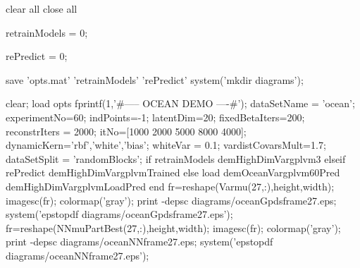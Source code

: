 \documentclass{article} %
\newenvironment{matlab}{\comment}{\endcomment}
\begin{document}
\begin{matlab}


clear all
close all

retrainModels = 0;

rePredict = 0;


save 'opts.mat' 'retrainModels' 'rePredict'
system('mkdir diagrams');

clear; load opts
fprintf(1,'\n\n#-----  OCEAN DEMO ----#\n');
dataSetName = 'ocean';
experimentNo=60;
indPoints=-1; latentDim=20;
fixedBetaIters=200; reconstrIters = 2000;
itNo=[1000 2000 5000 8000 4000];
dynamicKern={'rbf','white','bias'};
whiteVar = 0.1;  vardistCovarsMult=1.7;
dataSetSplit = 'randomBlocks';
if retrainModels
    demHighDimVargplvm3
elseif rePredict
    demHighDimVargplvmTrained
else
    load demOceanVargplvm60Pred
    demHighDimVargplvmLoadPred
end
fr=reshape(Varmu(27,:),height,width); imagesc(fr); colormap('gray'); %
print -depsc diagrams/oceanGpdsframe27.eps; system('epstopdf diagrams/oceanGpdsframe27.eps');
fr=reshape(NNmuPartBest(27,:),height,width); imagesc(fr); colormap('gray'); %
print -depsc diagrams/oceanNNframe27.eps; system('epstopdf diagrams/oceanNNframe27.eps');


\end{matlab}
\end{document}
